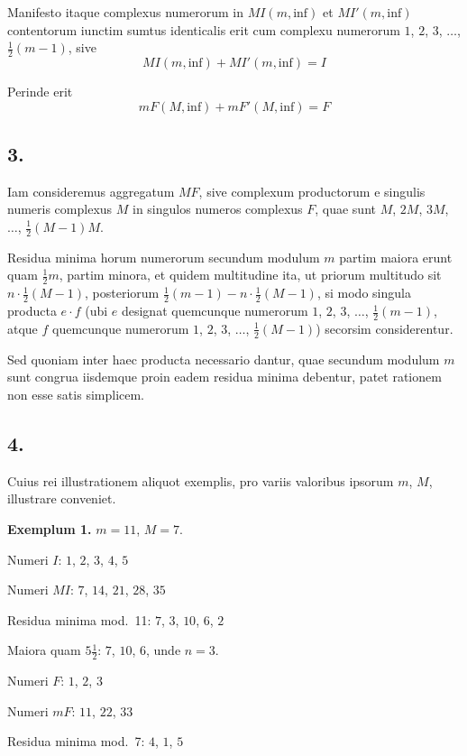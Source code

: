 \documentclass[12pt,a4paper]{article}
\theoremstyle{plain}
\theoremstyle{definition}
\theoremstyle{remark}
\begin{document}
Manifesto itaque complexus numerorum in $MI(m,\text{inf})$ et $MI'(m,\text{inf})$ contentorum iunctim sumtus identicalis erit cum complexu numerorum $1$, $2$, $3$, $\ldots$, $\frac{1}{2}(m-1)$, sive
\[MI(m,\text{inf}) + MI'(m,\text{inf}) = I\]

Perinde erit
\[mF(M,\text{inf}) + mF'(M,\text{inf}) = F\]

\newpage
\subsection*{3.}
Iam consideremus aggregatum $MF$, sive complexum productorum e singulis numeris complexus $M$ in singulos numeros complexus $F$, quae sunt $M$, $2M$, $3M$, $\ldots$, $\frac{1}{2}(M-1)M$.

Residua minima horum numerorum secundum modulum $m$ partim maiora erunt quam $\frac{1}{2}m$, partim minora, et quidem multitudine ita, ut priorum multitudo sit $n \cdot \frac{1}{2}(M-1)$, posteriorum $\frac{1}{2}(m-1)-n \cdot \frac{1}{2}(M-1)$, si modo singula producta $e \cdot f$ (ubi $e$ designat quemcunque numerorum $1$, $2$, $3$, $\ldots$, $\frac{1}{2}(m-1)$, atque $f$ quemcunque numerorum $1$, $2$, $3$, $\ldots$, $\frac{1}{2}(M-1)$) secorsim considerentur.

Sed quoniam inter haec producta necessario dantur, quae secundum modulum $m$ sunt congrua iisdemque proin eadem residua minima debentur, patet rationem non esse satis simplicem.

\newpage
\subsection*{4.}
Cuius rei illustrationem aliquot exemplis, pro variis valoribus ipsorum $m$, $M$, illustrare conveniet.

\begin{center}
\textbf{Exemplum 1.} $m=11$, $M=7$.
\end{center}

Numeri $I$: $1$, $2$, $3$, $4$, $5$

Numeri $MI$: $7$, $14$, $21$, $28$, $35$

Residua minima mod.~11: $7$, $3$, $10$, $6$, $2$

Maiora quam $5\frac{1}{2}$: $7$, $10$, $6$, unde $n=3$.

Numeri $F$: $1$, $2$, $3$

Numeri $mF$: $11$, $22$, $33$

Residua minima mod.~7: $4$, $1$, $5$
\end{document}
